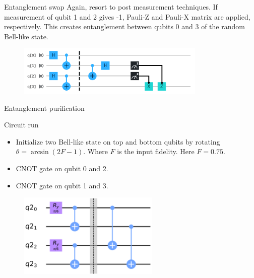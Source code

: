 \begin{frame}{Entanglement swap}
Again, resort to post measurement techniques. If measurement of qubit 1 and 2
gives -1, Pauli-Z and Pauli-X matrix are applied, respectively. This creates
entanglement between qubits 0 and 3 of the random Bell-like state.
\vspace{0.5cm}
  \begin{figure}[h] \centering
  \includegraphics[width=0.8\textwidth]{images/swap_general.png}
  \label{fig:swap_gen}
\end{figure}
	
\end{frame}

\begin{frame}{Entanglement purification}
	
\begin{block}{Circuit run}
  \begin{itemize}
    \item Initialize two Bell-like state on top and bottom qubits by rotating
$\theta = \arcsin{\left(2F-1\right)}$. Where $F$ is the input fidelity. Here $F = 0.75$.
    \item CNOT gate on qubit 0 and 2.
    \item CNOT gate on qubit 1 and 3.
  \end{itemize}
\end{block}
	
\begin{figure}[h] \centering
  \includegraphics[width=0.6\textwidth]{images/purification_circuit.png}
  \label{fig:puri_circ}
\end{figure}
	
\end{frame}

